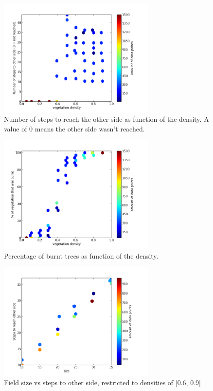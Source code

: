 \documentclass[a4paper]{report}
\begin{document}
\begin{figure}[htbp]
    \centering
    \includegraphics[width=0.7\textwidth]{./density_vs_steps.png}
    \caption{Number of steps to reach the other side as function of the density.
             A value of 0 means the other side wasn't reached.}
    \label{fig:steps}
\end{figure}

\begin{figure}[htbp]
    \centering
    \includegraphics[width=0.7\textwidth]{./density_vs_burnt.png}
    \caption{Percentage of burnt trees as function of the density.}
    \label{fig:burnt}
\end{figure}

\begin{figure}[htbp]
    \centering
    \includegraphics[width=0.7\textwidth]{./size_vs_steps.png}
    \caption{Field size vs steps to other side, restricted to densities of [0.6,
    \label{fig:size}
0.9]}
\end{figure}
\end{document}
